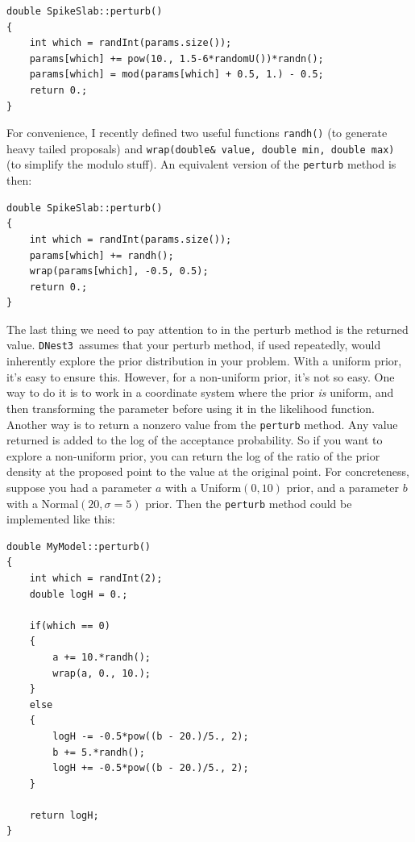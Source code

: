 \documentclass[a4paper, 11pt]{article}
\newcommand{\dnest}{{\tt DNest3}}
\begin{document}
\begin{framed}
\begin{verbatim}
double SpikeSlab::perturb()
{
    int which = randInt(params.size());
    params[which] += pow(10., 1.5-6*randomU())*randn();
    params[which] = mod(params[which] + 0.5, 1.) - 0.5;
    return 0.;
}
\end{verbatim}
\end{framed}

For convenience, I recently defined two useful functions {\tt randh()}
(to generate heavy tailed proposals) and
{\tt wrap(double\& value, double min, double max)} (to simplify the modulo
stuff). An equivalent version of the {\tt perturb} method is then:\\

\begin{framed}
\begin{verbatim}
double SpikeSlab::perturb()
{
    int which = randInt(params.size());
    params[which] += randh();
    wrap(params[which], -0.5, 0.5);
    return 0.;
}
\end{verbatim}
\end{framed}

The last thing we need to pay attention to in the perturb method is the
returned value. \dnest~assumes that your perturb method, if used repeatedly,
would inherently explore the prior distribution in your problem. With
a uniform prior, it's easy to ensure this. However, for a non-uniform prior,
it's not so easy. One way to do it is to work in a coordinate system where
the prior {\it is} uniform, and then transforming the parameter before using
it in the likelihood function. Another way is to return a nonzero value from
the {\tt perturb} method. Any value returned is added to the log of the
acceptance probability. So if you want to explore a non-uniform prior, you
can return the log of the ratio of the prior density at the proposed point
to the value at the original point. For concreteness, suppose you had a
parameter $a$ with a Uniform$(0,10)$ prior, and a parameter $b$ with a
Normal$(20, \sigma=5)$ prior. Then the {\tt perturb} method could be implemented
like this:\newpage

\begin{framed}
\begin{verbatim}
double MyModel::perturb()
{
    int which = randInt(2);
    double logH = 0.;

    if(which == 0)
    {
        a += 10.*randh();
        wrap(a, 0., 10.);
    }
    else
    {
        logH -= -0.5*pow((b - 20.)/5., 2);
        b += 5.*randh();
        logH += -0.5*pow((b - 20.)/5., 2);
    }

    return logH;
}
\end{verbatim}
\end{framed}
\end{document}
